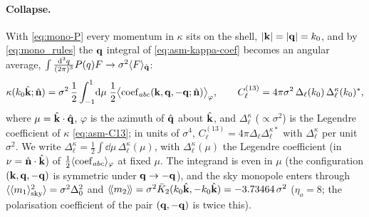 \paragraph{Collapse.}  With \eqref{eq:mono-P} every momentum in $\kappa$ sits on the shell, $|\mathbf k|=|\mathbf q|=k_0$, and by \eqref{eq:mono_rules}
the $\mathbf q$ integral of \eqref{eq:asm-kappa-coef} becomes an angular average, $\int\frac{\mathrm d^3q}{(2\pi)^3}P(q)F\to\sigma^2\langle F\rangle_{\hat{\mathbf q}}$:
\begin{equation}
\kappa(k_0\hat{\mathbf k};\hat{\mathbf n})=\sigma^2\,\frac12\int_{-1}^1\!\mathrm d\mu\;\frac12\big\langle{\rm coef}_{abc}(\mathbf k,\mathbf q,-\mathbf q;\hat{\mathbf n})\big\rangle_{\varphi},\qquad
C^{(13)}_\ell=4\pi\sigma^2\,\Delta_\ell(k_0)\,\Delta^\kappa_\ell(k_0)^*,
\label{eq:mono-C13}
\end{equation}
where $\mu=\hat{\mathbf k}\cdot\hat{\mathbf q}$, $\varphi$ is the azimuth of $\hat{\mathbf q}$ about $\hat{\mathbf k}$, and $\Delta^\kappa_\ell$ ($\propto\sigma^2$) is the Legendre coefficient of
$\kappa$ \eqref{eq:asm-C13}; in units of $\sigma^4$, $C^{(13)}_\ell=4\pi\Delta_\ell\Delta^{\kappa*}_\ell$ with $\Delta^\kappa_\ell$ per unit $\sigma^2$.  We write
$\Delta^\kappa_\ell=\tfrac12\int\dd\mu\,\Delta^\kappa_{\ell}(\mu)$, with $\Delta^\kappa_\ell(\mu)$ the Legendre coefficient (in $\nu=\hat{\mathbf n}\cdot\hat{\mathbf k}$) of
$\tfrac12\langle{\rm coef}_{abc}\rangle_\varphi$ at fixed $\mu$.  The integrand is even in $\mu$ (the configuration $(\mathbf k,\mathbf q,-\mathbf q)$ is symmetric
under $\mathbf q\to-\mathbf q$), and the sky monopole enters through $\langle\langle m_1\rangle_{\rm sky}^2\rangle=\sigma^2\Delta_0^2$ and $\langle\!\langle m_2\rangle\!\rangle=\sigma^2\bar K_2(k_0\hat{\mathbf k},-k_0\hat{\mathbf k})=-3.73464\,\sigma^2$
($\eta_o=8$; the polarisation coefficient of the pair $(\mathbf q,-\mathbf q)$ is twice this).

